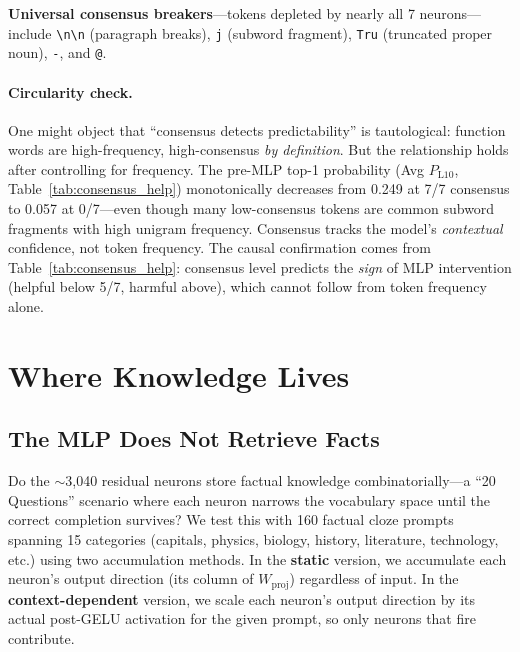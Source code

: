 \documentclass{article}
\begin{document}
\textbf{Universal consensus breakers}---tokens depleted by nearly all 7
neurons---include \texttt{\textbackslash n\textbackslash n} (paragraph breaks),
\texttt{j} (subword fragment), \texttt{Tru} (truncated proper noun), \texttt{-},
and \texttt{@}.

\paragraph{Circularity check.}
One might object that ``consensus detects predictability'' is tautological:
function words are high-frequency, high-consensus \emph{by definition}.
But the relationship holds after controlling for frequency.
The pre-MLP top-1 probability (Avg $P_\text{L10}$, Table~\ref{tab:consensus_help})
monotonically decreases from 0.249 at 7/7 consensus to 0.057 at 0/7---even
though many low-consensus tokens are common subword fragments with high
unigram frequency.
Consensus tracks the model's \emph{contextual} confidence, not
token frequency.
The causal confirmation comes from Table~\ref{tab:consensus_help}:
consensus level predicts the \emph{sign} of MLP intervention (helpful below
5/7, harmful above), which cannot follow from token frequency alone.

\section{Where Knowledge Lives}
\label{sec:knowledge}

\subsection{The MLP Does Not Retrieve Facts}

Do the $\sim$3{,}040 residual neurons store factual knowledge
combinatorially---a ``20 Questions'' scenario where each neuron narrows the
vocabulary space until the correct completion survives?
We test this with 160 factual cloze prompts spanning 15 categories
(capitals, physics, biology, history, literature, technology, etc.)
using two accumulation methods.
In the \textbf{static} version, we accumulate each neuron's output direction
(its column of $W_\text{proj}$) regardless of input.
In the \textbf{context-dependent} version, we scale each neuron's output
direction by its actual post-GELU activation for the given prompt, so only
neurons that fire contribute.
\end{document}
